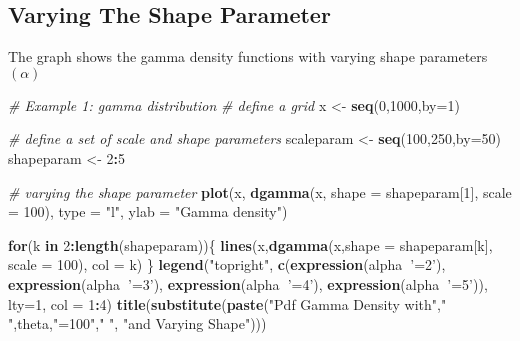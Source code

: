 \documentclass[]{book}
\newenvironment{Shaded}{\begin{snugshade}}{\end{snugshade}}
\newcommand{\KeywordTok}[1]{\textcolor[rgb]{0.13,0.29,0.53}{\textbf{#1}}}
\newcommand{\DataTypeTok}[1]{\textcolor[rgb]{0.13,0.29,0.53}{#1}}
\newcommand{\DecValTok}[1]{\textcolor[rgb]{0.00,0.00,0.81}{#1}}
\newcommand{\StringTok}[1]{\textcolor[rgb]{0.31,0.60,0.02}{#1}}
\newcommand{\CommentTok}[1]{\textcolor[rgb]{0.56,0.35,0.01}{\textit{#1}}}
\newcommand{\ControlFlowTok}[1]{\textcolor[rgb]{0.13,0.29,0.53}{\textbf{#1}}}
\newcommand{\OperatorTok}[1]{\textcolor[rgb]{0.81,0.36,0.00}{\textbf{#1}}}
\newcommand{\NormalTok}[1]{#1}
\theoremstyle{definition}
\theoremstyle{definition}
\theoremstyle{definition}
\theoremstyle{remark}
\begin{document}
\subsection{Varying The Shape
Parameter}\label{varying-the-shape-parameter}

The graph shows the gamma density functions with varying shape
parameters \((\alpha)\)

\begin{Shaded}
\begin{Highlighting}[]
\CommentTok{# Example 1: gamma distribution}
\CommentTok{# define a grid}
\NormalTok{x <-}\StringTok{ }\KeywordTok{seq}\NormalTok{(}\DecValTok{0}\NormalTok{,}\DecValTok{1000}\NormalTok{,}\DataTypeTok{by=}\DecValTok{1}\NormalTok{)}

\CommentTok{# define a set of scale and shape parameters}
\NormalTok{scaleparam <-}\StringTok{ }\KeywordTok{seq}\NormalTok{(}\DecValTok{100}\NormalTok{,}\DecValTok{250}\NormalTok{,}\DataTypeTok{by=}\DecValTok{50}\NormalTok{)}
\NormalTok{shapeparam <-}\StringTok{ }\DecValTok{2}\OperatorTok{:}\DecValTok{5}

\CommentTok{# varying the shape parameter}
\KeywordTok{plot}\NormalTok{(x, }\KeywordTok{dgamma}\NormalTok{(x, }\DataTypeTok{shape =}\NormalTok{ shapeparam[}\DecValTok{1}\NormalTok{], }\DataTypeTok{scale =} \DecValTok{100}\NormalTok{), }\DataTypeTok{type =} \StringTok{"l"}\NormalTok{, }\DataTypeTok{ylab =} \StringTok{"Gamma density"}\NormalTok{)}

\ControlFlowTok{for}\NormalTok{(k }\ControlFlowTok{in} \DecValTok{2}\OperatorTok{:}\KeywordTok{length}\NormalTok{(shapeparam))\{}
  \KeywordTok{lines}\NormalTok{(x,}\KeywordTok{dgamma}\NormalTok{(x,}\DataTypeTok{shape =}\NormalTok{ shapeparam[k], }\DataTypeTok{scale =} \DecValTok{100}\NormalTok{), }\DataTypeTok{col =}\NormalTok{ k)}
\NormalTok{\}}
\KeywordTok{legend}\NormalTok{(}\StringTok{"topright"}\NormalTok{, }\KeywordTok{c}\NormalTok{(}\KeywordTok{expression}\NormalTok{(alpha}\OperatorTok{~}\StringTok{'=2'}\NormalTok{), }\KeywordTok{expression}\NormalTok{(alpha}\OperatorTok{~}\StringTok{'=3'}\NormalTok{), }\KeywordTok{expression}\NormalTok{(alpha}\OperatorTok{~}\StringTok{'=4'}\NormalTok{), }\KeywordTok{expression}\NormalTok{(alpha}\OperatorTok{~}\StringTok{'=5'}\NormalTok{)), }\DataTypeTok{lty=}\DecValTok{1}\NormalTok{, }\DataTypeTok{col =} \DecValTok{1}\OperatorTok{:}\DecValTok{4}\NormalTok{)}
\KeywordTok{title}\NormalTok{(}\KeywordTok{substitute}\NormalTok{(}\KeywordTok{paste}\NormalTok{(}\StringTok{"Pdf Gamma Density with"}\NormalTok{,}\StringTok{" "}\NormalTok{,theta,}\StringTok{"=100"}\NormalTok{,}\StringTok{" "}\NormalTok{, }\StringTok{"and Varying Shape"}\NormalTok{)))}
\end{Highlighting}
\end{Shaded}
\end{document}
